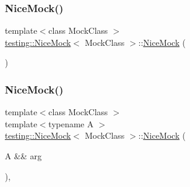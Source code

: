 \subsubsection{\texorpdfstring{NiceMock()}{NiceMock()}\hspace{0.1cm}{\footnotesize\ttfamily [1/17]}}
{\footnotesize\ttfamily template$<$class Mock\+Class $>$ \\
\mbox{\hyperlink{classtesting_1_1_nice_mock}{testing\+::\+Nice\+Mock}}$<$ Mock\+Class $>$\+::\mbox{\hyperlink{classtesting_1_1_nice_mock}{Nice\+Mock}} (\begin{DoxyParamCaption}{ }\end{DoxyParamCaption})\hspace{0.3cm}{\ttfamily [inline]}}

\mbox{\label{classtesting_1_1_nice_mock_a63f2d3b2af1c725036df39367c90fe6d}} 
\subsubsection{\texorpdfstring{NiceMock()}{NiceMock()}\hspace{0.1cm}{\footnotesize\ttfamily [2/17]}}
{\footnotesize\ttfamily template$<$class Mock\+Class $>$ \\
template$<$typename A $>$ \\
\mbox{\hyperlink{classtesting_1_1_nice_mock}{testing\+::\+Nice\+Mock}}$<$ Mock\+Class $>$\+::\mbox{\hyperlink{classtesting_1_1_nice_mock}{Nice\+Mock}} (\begin{DoxyParamCaption}\item[{A \&\&}]{arg }\end{DoxyParamCaption})\hspace{0.3cm}{\ttfamily [inline]}, {\ttfamily [explicit]}}

\mbox{\label{classtesting_1_1_nice_mock_a8d9f38b501fbbf1179f139451d29dd78}} 
